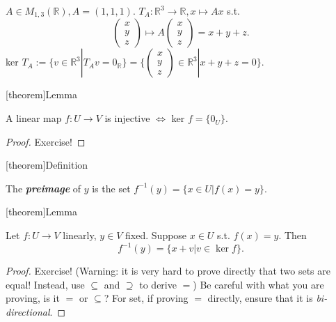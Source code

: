 \documentclass[12pt]{report}
\theoremstyle{definition}
\begin{document}
\begin{ex}
    $A \in M_{1,3}(\mathbb{R}), A = (1, 1, 1)$.
    $T_A:\mathbb{R}^{3} \rightarrow{} \mathbb{R}, x \mapsto Ax$
    s.t.\[
        \begin{pmatrix}
                x \\
                y \\
                z
        \end{pmatrix} \mapsto A \begin{pmatrix}
                x \\
                y \\
                z
        \end{pmatrix} = x + y + z.
    \]
    ker $T_A := \{v \in \mathbb{R}^{3} | T_A v = 0_\mathbb{R}\} =
        \{\begin{pmatrix}
                x \\
                y \\
                z
        \end{pmatrix} \in \mathbb{R}^{3} | x + y + z = 0\}$.
\end{ex}

[theorem]{Lemma}
\begin{injective linear map iif ker = 0V}
    A linear map $f:U\rightarrow{}V$ is injective $\iff$ ker $f = \{0_U\}$.
\end{injective linear map iif ker = 0V}

\begin{proof}
    Exercise!
\end{proof}

[theorem]{Definition}
\begin{preimage}
    The \textbf{\emph{preimage}} of $y$ is the set
    $f^{-1}(y) = \{x\in U | f(x) = y\}$.
\end{preimage}

[theorem]{Lemma}
\begin{preimage = x + elements of kernel}
    Let $f:U\rightarrow{} V$ linearly, $y \in V$ fixed.
    Suppose $x \in U$ s.t. $f(x) = y$. Then\[
        f^{-1}(y) = \{x + v | v \in \ker{f}\}.
    \]
\end{preimage = x + elements of kernel}

\begin{proof}
    Exercise! (Warning: it is very hard to prove directly that two sets are equal!
    Instead, use $\subseteq$ and $\supseteq$ to derive $=$)
    Be careful with what you are proving, is it $=$ or $\subseteq$?
    For set, if proving $=$ directly, ensure that it is \emph{bi-directional}.
\end{proof}
\end{document}
